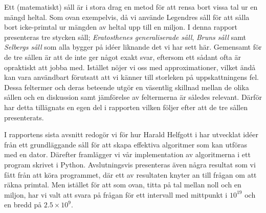 Ett (matematiskt) såll är i stora drag en metod för att rensa bort vissa tal ur en mängd heltal.
Som ovan exempelvis, då vi använde Legendres såll för att sålla bort icke-primtal ur mängden av heltal upp till en miljon.
I denna rapport presenteras tre stycken såll;
\textit{Eratosthenes generaliserade såll}, \textit{Bruns såll} samt \textit{Selbergs såll} som alla bygger på idéer liknande det vi har sett här.
Gemensamt för de tre sållen är att de inte ger något exakt svar, eftersom ett sådant ofta är opraktiskt att jobba med.
Istället nöjer vi oss med approximationer, vilket ändå kan vara användbart förutsatt att vi känner till storleken på uppskattningens fel.
Dessa feltermer och deras beteende utgör en väsentlig skillnad mellan de olika sållen och en diskussion samt jämförelse av feltermerna är således relevant. Därför har detta tillägnats en egen del i rapporten vilken följer efter att de tre sållen presenterats.


I rapportens sista avsnitt redogör vi för hur Harald Helfgott i \cite{HaraldSieve} har utvecklat idéer från ett grundläggande såll för att skapa effektiva algoritmer som kan utföras med en dator. 
Därefter framlägger vi vår implementation av algoritmerna i ett program skrivet i Python.
Avslutningsvis presenteras även några resultat som vi fått från att köra programmet,
där ett av resultaten knyter an till frågan om att räkna primtal.
Men istället för att som ovan, titta på tal mellan noll och en miljon, har vi valt att svara på frågan för ett intervall med mittpunkt i $10^{19}$ och en bredd på $2.5\times10^9$.